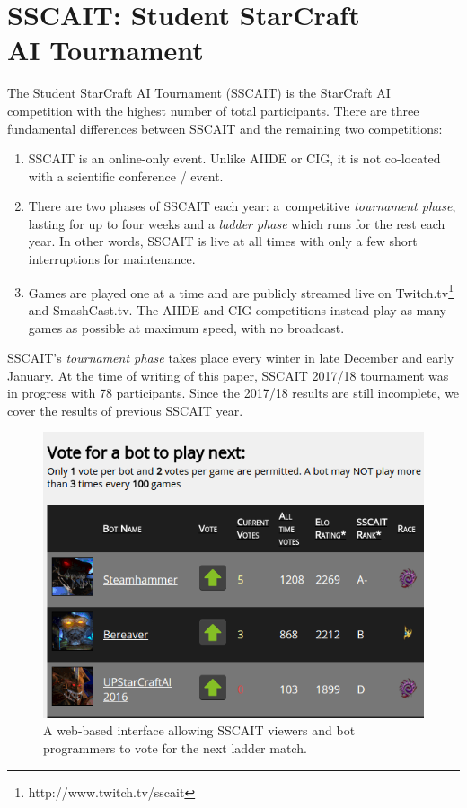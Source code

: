 \section{SSCAIT: Student StarCraft\\ AI Tournament}\label{subsecSSCAIT}

The Student StarCraft AI Tournament (SSCAIT) is the StarCraft AI competition with the highest number of total participants. There are three fundamental differences between SSCAIT and the remaining two competitions:
\begin{enumerate}
  \item SSCAIT is an online-only event. Unlike AIIDE or CIG, it is not co-located with a scientific conference / event. \item There are two phases of SSCAIT each year: a~competitive {\em tournament phase}, lasting for up to four weeks and a {\em ladder phase} which runs for the rest each year. In other words, SSCAIT is live at all times with only a few short interruptions for maintenance.
  \item Games are played one at a time and are publicly streamed live on Twitch.tv\footnote{http://www.twitch.tv/sscait} and SmashCast.tv. The AIIDE and CIG competitions instead play as many games as possible at maximum speed, with no broadcast.
\end{enumerate}

SSCAIT's {\em tournament phase} takes place every winter in late December and early January. At the time of writing of this paper, SSCAIT 2017/18 tournament was in progress with 78 participants. Since the 2017/18 results are still incomplete, we cover the results of previous SSCAIT year.

\begin{figure}[t]
  \centering
  \includegraphics[width=1\columnwidth]{fig/sscait-voting.png}
  \caption{A web-based interface allowing SSCAIT viewers and bot programmers to vote for the next ladder match.}
  \label{figSSCAITvoting}
\end{figure}

